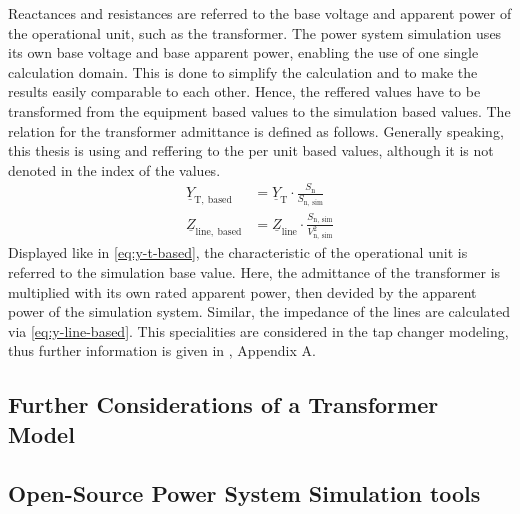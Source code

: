 Reactances and resistances are referred to the base voltage and apparent power of the operational unit, such as the transformer. The power system simulation uses its own base voltage and base apparent power, enabling the use of one single calculation domain. This is done to simplify the calculation and to make the results easily comparable to each other. Hence, the reffered values have to be transformed from the equipment based values to the simulation based values. The relation for the transformer admittance is defined as follows. Generally speaking, this thesis is using and reffering to the per unit based values, although it is not denoted in the index of the values.
\begin{align}
    \underline{Y}_\mathrm{T,~based}&=\underline{Y}_\mathrm{T} \cdot \frac{S_\mathrm{n}}{S_\mathrm{n,~sim}} \label{eq:y-t-based} \\[6pt]
    \underline{Z}_\mathrm{line,~based}&=\underline{Z}_\mathrm{line} \cdot \frac{S_\mathrm{n,~sim}}{V_\mathrm{n,~sim}^2} \label{eq:y-line-based}
\end{align}
Displayed like in \autoref{eq:y-t-based}, the characteristic of the operational unit is referred to the simulation base value. Here, the admittance of the transformer is multiplied with its own rated apparent power, then devided by the apparent power of the simulation system. Similar, the impedance of the lines are calculated via \autoref{eq:y-line-based}. This specialities are considered in the tap changer modeling, thus further information is given in \autocite{machowskiPowerSystemDynamics2020}, Appendix A.

\subsection{Further Considerations of a Transformer Model}


\subsection{Open-Source Power System Simulation tools}
    
        
